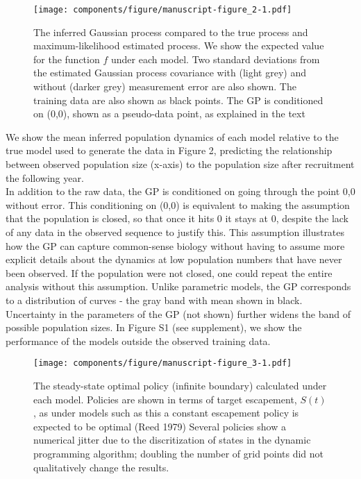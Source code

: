 \documentclass[author-year, 12pt,review]{components/elsarticle} %
\makeatletter
\def\maxwidth{\ifdim\Gin@nat@width>\linewidth\linewidth
\else\Gin@nat@width\fi}
\let\Oldincludegraphics\includegraphics
\renewcommand{\includegraphics}[1]{\Oldincludegraphics[width=\maxwidth]{#1}}
\makeatother
\begin{document}
\begin{figure}[htbp]
\centering
\texttt{[image: components/figure/manuscript-figure\_2-1.pdf]}
\caption{The inferred Gaussian process compared to the true process and
maximum-likelihood estimated process. We show the expected value for the
function $f$ under each model. Two standard deviations from the
estimated Gaussian process covariance with (light grey) and without
(darker grey) measurement error are also shown. The training data are
also shown as black points. The GP is conditioned on (0,0), shown as a
pseudo-data point, as explained in the text}
\end{figure}

We show the mean inferred population dynamics of each model relative to
the true model used to generate the data in Figure 2, predicting the
relationship between observed population size (x-axis) to the population
size after recruitment the following year.\\In addition to the raw data,
the GP is conditioned on going through the point 0,0 without error. This
conditioning on (0,0) is equivalent to making the assumption that the
population is closed, so that once it hits 0 it stays at 0, despite the
lack of any data in the observed sequence to justify this. This
assumption illustrates how the GP can capture common-sense biology
without having to assume more explicit details about the dynamics at low
population numbers that have never been observed. If the population were
not closed, one could repeat the entire analysis without this
assumption. Unlike parametric models, the GP corresponds to a
distribution of curves - the gray band with mean shown in black.
Uncertainty in the parameters of the GP (not shown) further widens the
band of possible population sizes. In Figure S1 (see supplement), we
show the performance of the models outside the observed training data.

\begin{figure}[htbp]
\centering
\texttt{[image: components/figure/manuscript-figure\_3-1.pdf]}
\caption{The steady-state optimal policy (infinite boundary) calculated
under each model. Policies are shown in terms of target escapement,
$S(t)$, as under models such as this a constant escapement policy is
expected to be optimal (Reed 1979) Several policies show a numerical
jitter due to the discritization of states in the dynamic programming
algorithm; doubling the number of grid points did not qualitatively
change the results.}
\end{figure}
\end{document}
